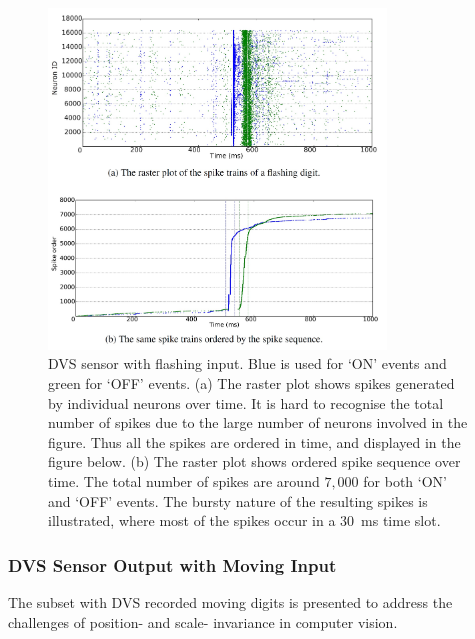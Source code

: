 \begin{figure}[hb!]
	\centering
	\includegraphics[width=0.8\textwidth]{pics_bench/fig5}	
	\caption{DVS sensor with flashing input.
	Blue is used for `ON' events and green for `OFF' events.
	(a) The raster plot shows spikes generated by individual neurons over time.
	It is hard to recognise the total number of spikes due to the large number of neurons involved in the figure.
	Thus all the spikes are ordered in time, and displayed in the figure below.
	(b) The raster plot shows ordered spike sequence over time.
	The total number of spikes are around $7,000$ for both `ON' and `OFF' events.
	The bursty nature of the resulting spikes is illustrated, where most of the spikes occur in a 30~ms time slot.}
	\label{fig:flash}
\end{figure}

\subsubsection{DVS Sensor Output with Moving Input}

The subset with DVS recorded moving digits is presented to address the challenges of position- and scale- invariance in computer vision.

